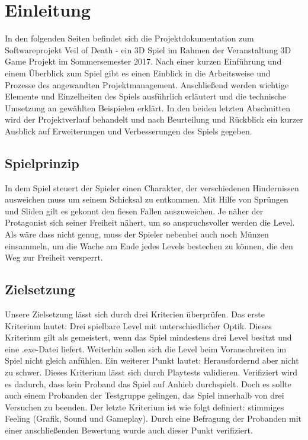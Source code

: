 \documentclass[10pt]{article}
\begin{document}



\newpage

\tableofcontents

\newpage
	
\section{Einleitung}
In den folgenden Seiten befindet sich die Projektdokumentation zum Softwareprojekt \glqq Veil of Death\grqq{} - ein 3D Spiel im Rahmen der Veranstaltung 3D Game Projekt im Sommersemester 2017. \newline
Nach einer kurzen Einführung und einem Überblick zum Spiel gibt es einen Einblick in die Arbeitsweise und Prozesse des angewandten Projektmanagement.
Anschließend werden wichtige Elemente und Einzelheiten des Spiels ausführlich erläutert und die technische Umsetzung an gewählten Beispielen erklärt.
In den beiden letzten Abschnitten wird der Projektverlauf behandelt und nach Beurteilung und Rückblick ein kurzer Ausblick auf Erweiterungen und Verbesserungen des Spiels gegeben.

\vspace{0.5cm}
\subsection{Spielprinzip}

In dem Spiel steuert der Spieler einen Charakter, der verschiedenen Hindernissen ausweichen muss um seinem Schicksal zu entkommen. Mit Hilfe von
Sprüngen und Sliden gilt es gekonnt den fiesen Fallen auszuweichen. Je näher der Protagonist sich seiner Freiheit nähert, um so anspruchsvoller werden die Level.
Als wäre dass nicht genug, muss der Spieler nebenbei auch noch Münzen einsammeln, um die Wache am Ende jedes Levels bestechen zu können, die den Weg zur Freiheit versperrt.

\vspace{0.5cm}
\subsection{Zielsetzung}

Unsere Zielsetzung lässt sich durch drei Kriterien überprüfen.\newline
Das erste Kriterium lautet: \glqq Drei spielbare Level mit unterschiedlicher Optik\grqq. Dieses
Kriterium gilt als gemeistert, wenn das Spiel mindestens drei Level besitzt und eine .exe-Datei liefert. Weiterhin sollen sich die Level beim Voranschreiten im
Spiel nicht gleich anfühlen.\newline
Ein weiterer Punkt lautet: \glqq Herausfordernd aber nicht zu schwer\grqq. Dieses Kriterium lässt sich durch Playtests validieren. Verifiziert wird es dadurch, dass
kein Proband das Spiel auf Anhieb durchspielt. Doch es sollte auch einem Probanden der Testgruppe gelingen, das Spiel innerhalb von drei Versuchen zu beenden.\newline
Der letzte Kriterium ist wie folgt definiert: \glqq stimmiges Feeling (Grafik, Sound und Gameplay)\grqq. Durch eine Befragung der Probanden mit einer anschließenden
Bewertung wurde auch dieser Punkt verifiziert.
\end{document}
